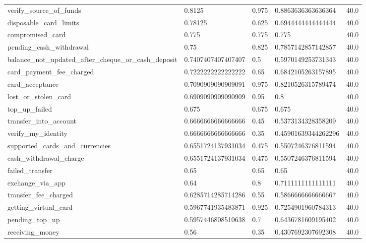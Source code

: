 \begin{table}[!ht]
\begin{tabularx}{\textwidth}{X l l l l}
verify\_source\_of\_funds & \num{0.8125} & \num{0.975} & \num{0.8863636363636364} & \num{40.0} \\
disposable\_card\_limits & \num{0.78125} & \num{0.625} & \num{0.6944444444444444} & \num{40.0} \\
compromised\_card & \num{0.775} & \num{0.775} & \num{0.775} & \num{40.0} \\
pending\_cash\_withdrawal & \num{0.75} & \num{0.825} & \num{0.7857142857142857} & \num{40.0} \\
balance\_not\_updated\_after\_cheque\_or\_cash\_deposit & \num{0.7407407407407407} & \num{0.5} & \num{0.5970149253731343} & \num{40.0} \\
card\_payment\_fee\_charged & \num{0.7222222222222222} & \num{0.65} & \num{0.6842105263157895} & \num{40.0} \\
card\_acceptance & \num{0.7090909090909091} & \num{0.975} & \num{0.8210526315789474} & \num{40.0} \\
lost\_or\_stolen\_card & \num{0.6909090909090909} & \num{0.95} & \num{0.8} & \num{40.0} \\
top\_up\_failed & \num{0.675} & \num{0.675} & \num{0.675} & \num{40.0} \\
transfer\_into\_account & \num{0.6666666666666666} & \num{0.45} & \num{0.5373134328358209} & \num{40.0} \\
verify\_my\_identity & \num{0.6666666666666666} & \num{0.35} & \num{0.45901639344262296} & \num{40.0} \\
supported\_cards\_and\_currencies & \num{0.6551724137931034} & \num{0.475} & \num{0.5507246376811594} & \num{40.0} \\
cash\_withdrawal\_charge & \num{0.6551724137931034} & \num{0.475} & \num{0.5507246376811594} & \num{40.0} \\
failed\_transfer & \num{0.65} & \num{0.65} & \num{0.65} & \num{40.0} \\
exchange\_via\_app & \num{0.64} & \num{0.8} & \num{0.7111111111111111} & \num{40.0} \\
transfer\_fee\_charged & \num{0.6285714285714286} & \num{0.55} & \num{0.5866666666666667} & \num{40.0} \\
getting\_virtual\_card & \num{0.5967741935483871} & \num{0.925} & \num{0.7254901960784313} & \num{40.0} \\
pending\_top\_up & \num{0.5957446808510638} & \num{0.7} & \num{0.6436781609195402} & \num{40.0} \\
receiving\_money & \num{0.56} & \num{0.35} & \num{0.4307692307692308} & \num{40.0} \\

\end{tabularx}
\end{table}
